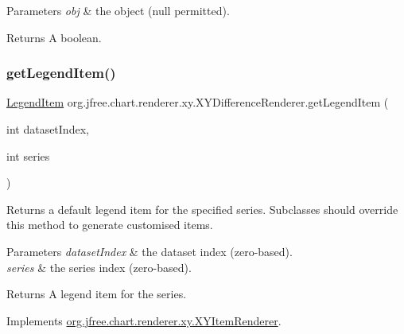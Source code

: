 \begin{DoxyParams}{Parameters}
{\em obj} & the object ({\ttfamily null} permitted).\\
\hline
\end{DoxyParams}
\begin{DoxyReturn}{Returns}
A boolean. 
\end{DoxyReturn}
\mbox{\label{classorg_1_1jfree_1_1chart_1_1renderer_1_1xy_1_1_x_y_difference_renderer_abba5d25319950deb90984aef12ef0486}} 
\subsubsection{\texorpdfstring{get\+Legend\+Item()}{getLegendItem()}}
{\footnotesize\ttfamily \mbox{\hyperlink{classorg_1_1jfree_1_1chart_1_1_legend_item}{Legend\+Item}} org.\+jfree.\+chart.\+renderer.\+xy.\+X\+Y\+Difference\+Renderer.\+get\+Legend\+Item (\begin{DoxyParamCaption}\item[{int}]{dataset\+Index,  }\item[{int}]{series }\end{DoxyParamCaption})}

Returns a default legend item for the specified series. Subclasses should override this method to generate customised items.


\begin{DoxyParams}{Parameters}
{\em dataset\+Index} & the dataset index (zero-\/based). \\
\hline
{\em series} & the series index (zero-\/based).\\
\hline
\end{DoxyParams}
\begin{DoxyReturn}{Returns}
A legend item for the series. 
\end{DoxyReturn}


Implements \mbox{\hyperlink{interfaceorg_1_1jfree_1_1chart_1_1renderer_1_1xy_1_1_x_y_item_renderer_a792c3e8c39bf57711528cd8064d2ddb5}{org.\+jfree.\+chart.\+renderer.\+xy.\+X\+Y\+Item\+Renderer}}.

